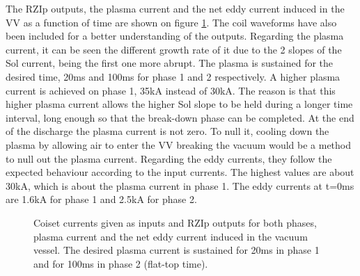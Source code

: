 \documentclass[a4paper,12pt,oneside]{book}
\begin{document}
The RZIp outputs, the plasma current and the net eddy current induced in the VV as a function of time are shown on figure \ref{fig_RZIp}. The coil waveforms have also been included for a better understanding of the outputs. Regarding the plasma current, it can be seen the different growth rate of it due to the 2 slopes of the Sol current, being the first one more abrupt. The plasma is sustained for the desired time, 20ms and 100ms for phase 1 and 2 respectively. A higher plasma current is achieved on phase 1, 35kA instead of 30kA. The reason is that this higher plasma current allows the higher Sol slope to be held during a longer time interval, long enough so that the break-down phase can be completed.
%
At the end of the discharge the plasma current is not zero. To null it, cooling down the plasma by allowing air to enter the VV breaking the vacuum would be a method to null out the plasma current. 
%
%
Regarding the eddy currents, they follow the expected behaviour according to the input currents.
%
The highest values are about 30kA, which is about the plasma current in phase 1. The eddy currents at t=0ms are 1.6kA for phase 1 and 2.5kA for phase 2.
%





\begin{figure}[htbp]
\centering
{}
\hfill
{}

\hfill
{}

\hfill
{}
\caption{Coiset currents given as inputs and RZIp outputs for both phases, plasma current and the net eddy current induced in the vacuum vessel. The desired plasma current is sustained for 20ms in phase 1 and for 100ms in phase 2 (flat-top time).}
\label{fig_RZIp}
\end{figure}
\end{document}
